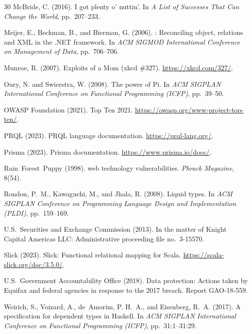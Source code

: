 \documentclass[11pt,a4paper]{article}
\begin{document}
\begin{thebibliography}{30}
McBride, C. (2016).
\newblock I got plenty o' nuttin'.
\newblock In \emph{A List of Successes That Can Change the World}, pp.~207--233.

Meijer, E., Beckman, B., and Bierman, G. (2006).
: Reconciling object, relations and {XML} in the {.NET}
  framework.
\newblock In \emph{ACM SIGMOD International Conference on Management of Data},
  pp.~706--706.

Munroe, R. (2007).
\newblock Exploits of a Mom (xkcd \#327).
\newblock \url{https://xkcd.com/327/}.

Oury, N. and Swierstra, W. (2008).
\newblock The power of {Pi}.
\newblock In \emph{ACM SIGPLAN International Conference on Functional
  Programming (ICFP)}, pp.~39--50.

OWASP Foundation (2021).
 Top Ten 2021.
\newblock \url{https://owasp.org/www-project-top-ten/}.

PRQL (2023).
\newblock PRQL language documentation.
\newblock \url{https://prql-lang.org/}.

Prisma (2023).
\newblock Prisma documentation.
\newblock \url{https://www.prisma.io/docs/}.

Rain~Forest~Puppy (1998).
 web technology vulnerabilities.
\newblock \emph{Phrack Magazine}, 8(54).

Rondon, P.~M., Kawaguchi, M., and Jhala, R. (2008).
\newblock Liquid types.
\newblock In \emph{ACM SIGPLAN Conference on Programming Language Design and
  Implementation (PLDI)}, pp.~159--169.

U.S.~Securities and Exchange Commission (2013).
\newblock In the matter of Knight Capital Americas {LLC}: Administrative
  proceeding file no.~3-15570.

Slick (2023).
\newblock Slick: Functional relational mapping for Scala.
\newblock \url{https://scala-slick.org/doc/3.5.0/}.

U.S.~Government Accountability Office (2018).
\newblock Data protection: Actions taken by Equifax and federal agencies in
  response to the 2017 breach.
\newblock Report GAO-18-559.

Weirich, S., Voizard, A., de~Amorim, P. H.~A., and Eisenberg, R.~A. (2017).
\newblock A specification for dependent types in Haskell.
\newblock In \emph{ACM SIGPLAN International Conference on Functional
  Programming (ICFP)}, pp.~31:1--31:29.

\end{thebibliography}
\end{document}
